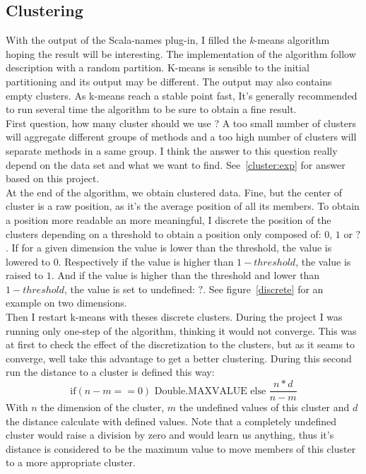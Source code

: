 \documentclass[12pt]{article}
\begin{document}
\subsection{Clustering}
\label{cluster}
With the output of the Scala-names plug-in, I filled the \textit{k}-means algorithm~\cite{kMeans} hoping the result will be interesting. The implementation of the algorithm follow~\cite{kMeans} description with a random partition. K-means is sensible to the initial partitioning and its output may be different. The output may also contains empty clusters. As k-means reach a stable point fast, It's generally recommended to run several time the algorithm to be sure to obtain a fine result.\\
First question, how many cluster should we use ? A too small number of clusters will aggregate different groups of methods and a too high number of clusters will separate methods in a same group. I think the answer to this question really depend on the data set and what we want to find. See~\ref{cluster:exp} for answer based on this project.\\
At the end of the algorithm, we obtain clustered data. Fine, but the center of cluster is a raw position, as it's the average position of all its members. To obtain a position more readable an more meaningful, I discrete the position of the clusters depending on a threshold to obtain a position only composed of: $0$, $1$ or $?$. If for a given dimension the value is lower than the threshold, the value is lowered to $0$. Respectively if the value is higher than $1-threshold$, the value is raised to $1$. And if the value is higher than the threshold and lower than $1-threshold$, the value is set to undefined: $?$. See figure~\ref{discrete} for an example on two dimensions.\\
Then I restart k-means with theses discrete clusters. During the project I was running only one-step of the algorithm, thinking it would not converge. This was at first to check the effect of the discretization to the clusters, but as it seams to converge, well take this advantage to get a better clustering. During this second run the distance to a cluster is defined this way:\begin{equation}\label{equa1}\mbox{if} (n-m ==0) \mbox{ Double.MAXVALUE else }\frac{n*d}{n-m}\end{equation} With $n$ the dimension of the cluster, $m$ the undefined values of this cluster and $d$ the distance calculate with defined values. Note that a completely undefined cluster would raise a division by zero and would learn us anything, thus it's distance is considered to be the maximum value to move members of this cluster to a more appropriate cluster. \\
\end{document}
